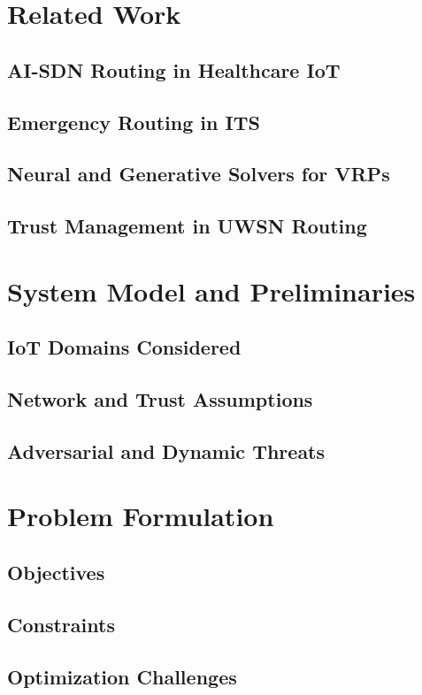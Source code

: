 \documentclass[a4paper,fleqn]{cas-dc}
\numberwithin{equation}{section}
\begin{document}
\section{Related Work}
\subsection{AI-SDN Routing in Healthcare IoT}
\subsection{Emergency Routing in ITS}
\subsection{Neural and Generative Solvers for VRPs}
\subsection{Trust Management in UWSN Routing}

\section{System Model and Preliminaries}
\subsection{IoT Domains Considered}
\subsection{Network and Trust Assumptions}
\subsection{Adversarial and Dynamic Threats}

\section{Problem Formulation}
\subsection{Objectives}
\subsection{Constraints}
\subsection{Optimization Challenges}
\end{document}

